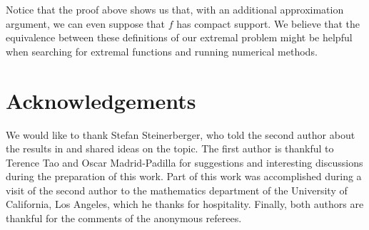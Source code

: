 \documentclass[11pt, reqno]{amsart}
\numberwithin{equation}{section}
\begin{document}
Notice that the proof above shows us that, with an additional approximation argument, we can even suppose that $f$ has compact support. We believe that the equivalence between these definitions of our extremal problem 
might be helpful when searching for extremal functions and running numerical methods. 

\section*{Acknowledgements} 

We would like to thank Stefan Steinerberger, who told the second author about the results in \cite{BarnardSteinerberger} and shared ideas on the topic. The first author is thankful to Terence Tao and Oscar Madrid-Padilla for suggestions and interesting discussions during the preparation of this work. Part of this work was accomplished during a visit
of the second author to the mathematics department of the University of California, Los Angeles, which he thanks for hospitality. Finally, both authors are thankful for the comments of the anonymous referees. 
\end{document}
